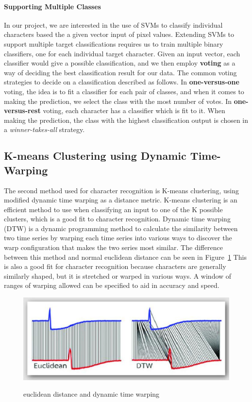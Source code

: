 \documentclass[12pt]{article}
\begin{document}
	\paragraph{Supporting Multiple Classes}
	In our project, we are interested in the use of SVMs to classify individual characters based the a given vector input of pixel values. Extending SVMs to support multiple target classifications requires us to train multiple binary classifiers, one for each individual target character. Given an input vector, each classifier would give a possible classification, and we then employ \textbf{voting} as a way of deciding the best classification result for our data. The common voting strategies to decide on a classification described as follows. 	In \textbf{one-versus-one} voting, the idea is to fit a classifier for each pair of classes, and when it comes to making the prediction, we select the class with the most number of votes. In \textbf{one-versus-rest} voting, each character has a classifier which is fit to it. When making the prediction, the class with the highest classification output is chosen in a \textit{winner-takes-all} strategy.

	\subsection{K-means Clustering using Dynamic Time-Warping}
	\label{subsection:dtw}
	The second method used for character recognition is K-means clustering, using modified dynamic time warping as a distance metric. K-means clustering is an efficient method to use when classifying an input to one of the K possible clusters, which is a good fit to character recognition. Dynamic time warping (DTW) is a dynamic programming method to calculate the similarity between two time series by warping each time series into various ways to discover the warp configuration that makes the two series most similar. The difference between this method and normal euclidean distance can be seen in Figure~\ref{figure:dtw} This is also a good fit for character recognition because characters are generally similarly shaped, but it is stretched or warped in various ways. A window of ranges of warping allowed can be specified to aid in accuracy and speed.
	
	\begin{figure}[htbp!]
		\centering
		\includegraphics[scale=0.7]{dtw.eps}
		\label{figure:dtw}
		\caption{euclidean distance and dynamic time warping}
		\end{figure}
	
\end{document}
